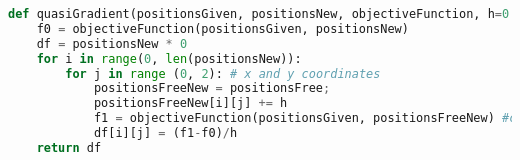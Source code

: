 \begin{lstlisting}[language=Python, style=jupycolors]
def quasiGradient(positionsGiven, positionsNew, objectiveFunction, h=0.01):
    f0 = objectiveFunction(positionsGiven, positionsNew)
    df = positionsNew * 0
    for i in range(0, len(positionsNew)):
        for j in range (0, 2): # x and y coordinates
            positionsFreeNew = positionsFree; 
            positionsFreeNew[i][j] += h
            f1 = objectiveFunction(positionsGiven, positionsFreeNew) #changed from positionsFixed
            df[i][j] = (f1-f0)/h
    return df
\end{lstlisting}